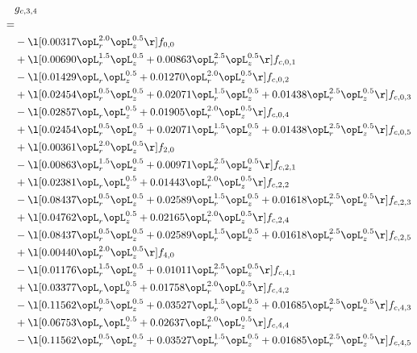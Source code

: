 \begin{alignat}{2} 
\label{eq:g_34_0} 
& g_{c,3,4} \nonumber \\ 
 = \\ 
& - \l[  0.00317 \opL_r^{2.0} \opL_z^{0.5}  \r] f_{0,0} \nonumber \\ 
& + \l[  0.00690 \opL_r^{1.5} \opL_z^{0.5} +  0.00863 \opL_r^{2.5} \opL_z^{0.5}  \r] f_{c,0,1} \nonumber \\ 
& - \l[  0.01429 \opL_r \opL_z^{0.5} +  0.01270 \opL_r^{2.0} \opL_z^{0.5}  \r] f_{c,0,2} \nonumber \\ 
& + \l[  0.02454 \opL_r^{0.5} \opL_z^{0.5} +  0.02071 \opL_r^{1.5} \opL_z^{0.5} +  0.01438 \opL_r^{2.5} \opL_z^{0.5}  \r] f_{c,0,3} \nonumber \\ 
& - \l[  0.02857 \opL_r \opL_z^{0.5} +  0.01905 \opL_r^{2.0} \opL_z^{0.5}  \r] f_{c,0,4} \nonumber \\ 
& + \l[  0.02454 \opL_r^{0.5} \opL_z^{0.5} +  0.02071 \opL_r^{1.5} \opL_z^{0.5} +  0.01438 \opL_r^{2.5} \opL_z^{0.5}  \r] f_{c,0,5} \nonumber \\ 
& + \l[  0.00361 \opL_r^{2.0} \opL_z^{0.5}  \r] f_{2,0} \nonumber \\ 
& - \l[  0.00863 \opL_r^{1.5} \opL_z^{0.5} +  0.00971 \opL_r^{2.5} \opL_z^{0.5}  \r] f_{c,2,1} \nonumber \\ 
& + \l[  0.02381 \opL_r \opL_z^{0.5} +  0.01443 \opL_r^{2.0} \opL_z^{0.5}  \r] f_{c,2,2} \nonumber \\ 
& - \l[  0.08437 \opL_r^{0.5} \opL_z^{0.5} +  0.02589 \opL_r^{1.5} \opL_z^{0.5} +  0.01618 \opL_r^{2.5} \opL_z^{0.5}  \r] f_{c,2,3} \nonumber \\ 
& + \l[  0.04762 \opL_r \opL_z^{0.5} +  0.02165 \opL_r^{2.0} \opL_z^{0.5}  \r] f_{c,2,4} \nonumber \\ 
& - \l[  0.08437 \opL_r^{0.5} \opL_z^{0.5} +  0.02589 \opL_r^{1.5} \opL_z^{0.5} +  0.01618 \opL_r^{2.5} \opL_z^{0.5}  \r] f_{c,2,5} \nonumber \\ 
& + \l[  0.00440 \opL_r^{2.0} \opL_z^{0.5}  \r] f_{4,0} \nonumber \\ 
& - \l[  0.01176 \opL_r^{1.5} \opL_z^{0.5} +  0.01011 \opL_r^{2.5} \opL_z^{0.5}  \r] f_{c,4,1} \nonumber \\ 
& + \l[  0.03377 \opL_r \opL_z^{0.5} +  0.01758 \opL_r^{2.0} \opL_z^{0.5}  \r] f_{c,4,2} \nonumber \\ 
& - \l[  0.11562 \opL_r^{0.5} \opL_z^{0.5} +  0.03527 \opL_r^{1.5} \opL_z^{0.5} +  0.01685 \opL_r^{2.5} \opL_z^{0.5}  \r] f_{c,4,3} \nonumber \\ 
& + \l[  0.06753 \opL_r \opL_z^{0.5} +  0.02637 \opL_r^{2.0} \opL_z^{0.5}  \r] f_{c,4,4} \nonumber \\ 
& - \l[  0.11562 \opL_r^{0.5} \opL_z^{0.5} +  0.03527 \opL_r^{1.5} \opL_z^{0.5} +  0.01685 \opL_r^{2.5} \opL_z^{0.5}  \r] f_{c,4,5} \nonumber \\ 
\end{alignat} 


